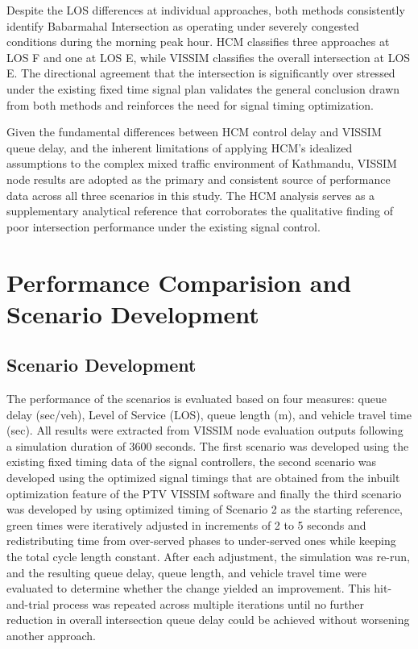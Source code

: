 Despite the LOS differences at individual approaches, both 
methods consistently identify Babarmahal Intersection as 
operating under severely congested conditions during the 
morning peak hour. HCM classifies three approaches at LOS 
F and one at LOS E, while VISSIM classifies the overall 
intersection at LOS E. The directional agreement that 
the intersection is significantly over stressed under the 
existing fixed time signal plan validates the general 
conclusion drawn from both methods and reinforces the need 
for signal timing optimization.

Given the fundamental differences between HCM control delay and 
VISSIM queue delay, and the inherent limitations of 
applying HCM's idealized assumptions to the complex mixed 
traffic environment of Kathmandu, VISSIM node results are 
adopted as the primary and consistent source of performance 
data across all three scenarios in this study. The HCM 
analysis serves as a supplementary analytical reference 
that corroborates the qualitative finding of poor 
intersection performance under the existing signal control.

\section{Performance Comparision and Scenario Development}

\subsection{Scenario Development}

The performance of the scenarios is evaluated based on four measures: queue delay
(sec/veh), Level of Service (LOS), queue length (m), and vehicle travel time (sec). 
All results were extracted from VISSIM node evaluation outputs following a simulation 
duration of 3600 seconds. The first scenario was developed using the existing fixed timing data of 
the signal controllers, the second scenario was developed using the optimized signal timings that are obtained from the inbuilt optimization feature of the PTV VISSIM software and finally the third scenario was developed by using optimized timing of Scenario 2 as the starting reference, green times were iteratively adjusted in increments of 2 to 5 seconds and redistributing time from over-served phases to under-served ones while keeping the total cycle length constant. After each adjustment, the simulation was re-run, and the resulting queue delay, queue length, and vehicle travel time were evaluated to determine whether the change yielded an improvement. This hit-and-trial process was repeated across multiple iterations until no further reduction in overall intersection queue delay could be achieved without worsening another approach.


